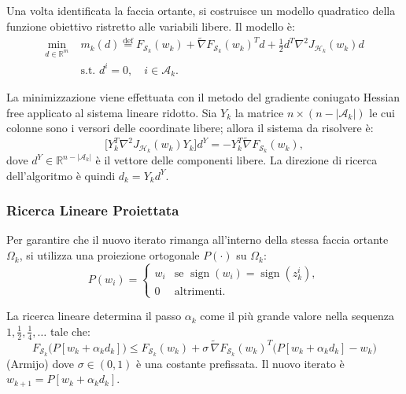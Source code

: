 \documentclass[a4paper,12pt]{article}
\begin{document}
Una volta identificata la faccia ortante, si costruisce un modello quadratico
della funzione obiettivo ristretto alle variabili libere. Il modello è:
\begin{equation}
\begin{aligned}
\min_{d \in \mathbb{R}^m} \;& m_k(d) \stackrel{\mathrm{def}}{=}
F_{\mathcal{S}_k}(w_k) + \widetilde{\nabla}F_{\mathcal{S}_k}(w_k)^T d
+ \frac{1}{2} d^T \nabla^2 J_{\mathcal{H}_k}(w_k) d \\
& \text{s.t. } d^i = 0, \quad i \in \mathcal{A}_k.
\end{aligned} \tag{6.7}
\end{equation}

La minimizzazione viene effettuata con il metodo del gradiente coniugato
Hessian free applicato al sistema lineare ridotto. Sia $Y_k$ la matrice
$n \times (n - |\mathcal{A}_k|)$ le cui colonne sono i versori delle coordinate
libere; allora il sistema da risolvere è:
\begin{equation}
\bigl[ Y_k^T \nabla^2 J_{\mathcal{H}_k}(w_k) Y_k \bigr] d^Y
= -Y_k^T \widetilde{\nabla}F_{\mathcal{S}_k}(w_k), \tag{6.8}
\end{equation}
dove $d^Y \in \mathbb{R}^{n-|\mathcal{A}_k|}$ è il vettore delle componenti libere.
La direzione di ricerca dell'algoritmo è quindi $d_k = Y_k d^Y$.

\subsubsection{Ricerca Lineare Proiettata}

Per garantire che il nuovo iterato rimanga all'interno della stessa faccia
ortante $\Omega_k$, si utilizza una proiezione ortogonale $P(\cdot)$
su $\Omega_k$:
\begin{equation}
P(w_i) =
\begin{cases}
w_i & \text{se } \operatorname{sign}(w_i) = \operatorname{sign}(z_k^i), \\[4pt]
0   & \text{altrimenti}.
\end{cases} \tag{6.9}
\end{equation}

La ricerca lineare determina il passo $\alpha_k$ come il più grande valore
nella sequenza $1, \frac{1}{2}, \frac{1}{4}, \dots$ tale che:
\begin{equation}
F_{\mathcal{S}_k}\bigl(P[w_k + \alpha_k d_k]\bigr)
\le F_{\mathcal{S}_k}(w_k)
+ \sigma \, \widetilde{\nabla}F_{\mathcal{S}_k}(w_k)^T
\bigl(P[w_k + \alpha_k d_k] - w_k\bigr)\tag{6.10}
\end{equation}
(Armijo)
dove $\sigma \in (0,1)$ è una costante prefissata. Il nuovo iterato è
$w_{k+1} = P[w_k + \alpha_k d_k]$.
\end{document}
